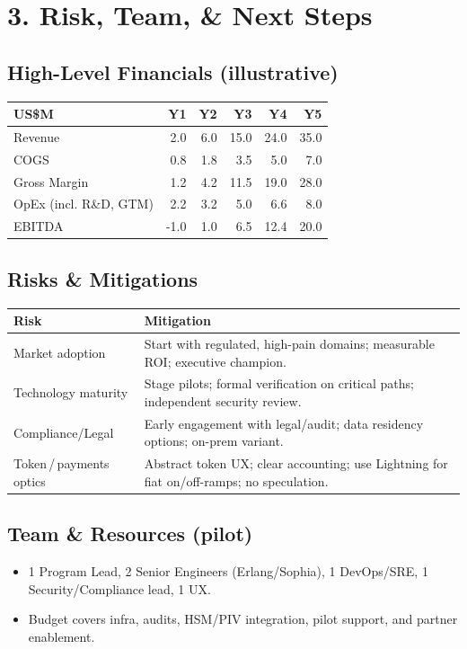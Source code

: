 \documentclass[11pt]{article}
\begin{document}
\section*{3. Risk, Team, \& Next Steps}
\subsection*{High-Level Financials (illustrative)}
\noindent\begin{tabularx}{\linewidth}{@{}lrrrrr@{}}
\toprule
\textbf{US\$M} & \textbf{Y1} & \textbf{Y2} & \textbf{Y3} & \textbf{Y4} & \textbf{Y5} \\
\midrule
Revenue & 2.0 & 6.0 & 15.0 & 24.0 & 35.0 \\
COGS & 0.8 & 1.8 & 3.5 & 5.0 & 7.0 \\
Gross Margin & 1.2 & 4.2 & 11.5 & 19.0 & 28.0 \\
OpEx (incl. R\&D, GTM) & 2.2 & 3.2 & 5.0 & 6.6 & 8.0 \\
EBITDA & -1.0 & 1.0 & 6.5 & 12.4 & 20.0 \\
\bottomrule
\end{tabularx}

\subsection*{Risks \& Mitigations}
\noindent\begin{tabularx}{\linewidth}{@{}lX@{}}
\toprule
\textbf{Risk} & \textbf{Mitigation} \\
\midrule
Market adoption & Start with regulated, high-pain domains; measurable ROI; executive champion. \\
Technology maturity & Stage pilots; formal verification on critical paths; independent security review. \\
Compliance/Legal & Early engagement with legal/audit; data residency options; on-prem variant. \\
Token\,/\,payments optics & Abstract token UX; clear accounting; use Lightning for fiat on/off-ramps; no speculation. \\
\bottomrule
\end{tabularx}

\subsection*{Team \& Resources (pilot)}
\begin{itemize}
  \item 1 Program Lead, 2 Senior Engineers (Erlang/Sophia), 1 DevOps/SRE, 1 Security/Compliance lead, 1 UX.\\
  \item Budget covers infra, audits, HSM/PIV integration, pilot support, and partner enablement.
\end{itemize}
\end{document}
